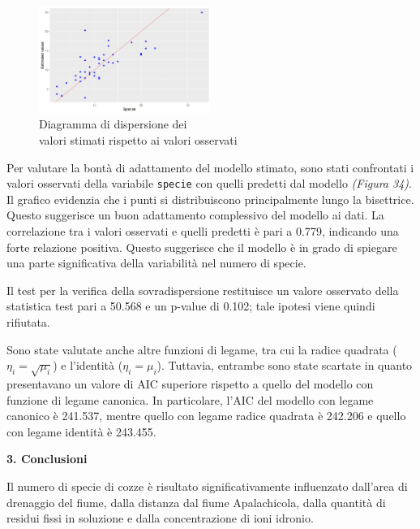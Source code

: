 \documentclass{article} %
\begin{document}
\begin{figure}[H]
    \centering
    \includegraphics[width=0.5\textwidth]{immagini/res_val_oss_glm.png}
    \captionsetup{justification=centering}
    \caption{Diagramma di dispersione dei \\valori stimati rispetto ai valori osservati}
\end{figure}

Per valutare la bontà di adattamento del modello stimato, sono stati confrontati i valori osservati della variabile \texttt{specie} con quelli predetti dal modello \textit{(Figura 34)}. Il grafico evidenzia che i punti si distribuiscono principalmente lungo la bisettrice. Questo suggerisce un buon adattamento complessivo del modello ai dati. La correlazione tra i valori osservati e quelli predetti è pari a 0.779, indicando una forte relazione positiva. Questo suggerisce che il modello è in grado di spiegare una parte significativa della variabilità nel numero di specie.

Il test per la verifica della sovradispersione restituisce un valore osservato della statistica test pari a 50.568 e un p-value di 0.102; tale ipotesi viene quindi rifiutata.  

Sono state valutate anche altre funzioni di legame, tra cui la radice quadrata ($\eta_i=\sqrt{\mu_i}$) e l'identità ($\eta_i=\mu_i$). Tuttavia, entrambe sono state scartate in quanto presentavano un valore di AIC superiore rispetto a quello del modello con funzione di legame canonica. In particolare, l'AIC del modello con legame canonico è 241.537, mentre quello con legame radice quadrata è 242.206 e quello con legame identità è 243.455.

\vskip 70pt
\begin{flushleft}
    \textbf{\Huge 3. \: Conclusioni}
\end{flushleft}
\vskip 10pt

Il numero di specie di cozze è risultato significativamente influenzato dall'area di drenaggio del fiume, dalla distanza dal fiume Apalachicola, dalla quantità di residui fissi in soluzione e dalla concentrazione di ioni idronio.
\end{document}
